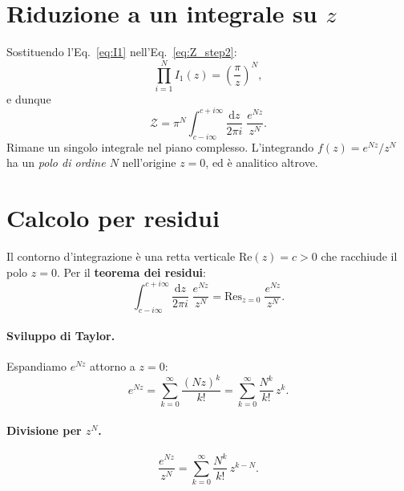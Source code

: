 \documentclass[a4paper,11pt]{article}
\newcommand{\de}{\mathrm{d}}
\begin{document}
\section{Riduzione a un integrale su $z$}

Sostituendo l'Eq.~\eqref{eq:I1} nell'Eq.~\eqref{eq:Z_step2}:
\begin{equation}
  \prod_{i=1}^{N} I_1(z) = \left(\frac{\pi}{z}\right)^{\!N} ,
\end{equation}
e dunque
\begin{equation}\label{eq:Z_contour}
  \mathcal{Z}
  = \pi^N \int_{c - i\infty}^{c + i\infty}
    \frac{\de z}{2\pi i}\; \frac{e^{Nz}}{z^N} .
\end{equation}
Rimane un singolo integrale nel piano complesso.
L'integrando $f(z) = e^{Nz}/z^N$ ha un \emph{polo di ordine $N$}
nell'origine $z = 0$, ed è analitico altrove.

\section{Calcolo per residui}

Il contorno d'integrazione è una retta verticale $\mathrm{Re}(z) = c > 0$
che racchiude il polo $z = 0$. Per il \textbf{teorema dei residui}:
\begin{equation}\label{eq:residue_thm}
  \int_{c - i\infty}^{c + i\infty} \frac{\de z}{2\pi i}\; \frac{e^{Nz}}{z^N}
  = \mathrm{Res}_{z=0}\; \frac{e^{Nz}}{z^N} .
\end{equation}

\paragraph{Sviluppo di Taylor.}
Espandiamo $e^{Nz}$ attorno a $z = 0$:
\begin{equation}
  e^{Nz} = \sum_{k=0}^{\infty} \frac{(Nz)^k}{k!}
          = \sum_{k=0}^{\infty} \frac{N^k}{k!}\, z^k .
\end{equation}

\paragraph{Divisione per $z^N$.}
\begin{equation}
  \frac{e^{Nz}}{z^N}
  = \sum_{k=0}^{\infty} \frac{N^k}{k!}\, z^{k - N} .
\end{equation}
\end{document}
